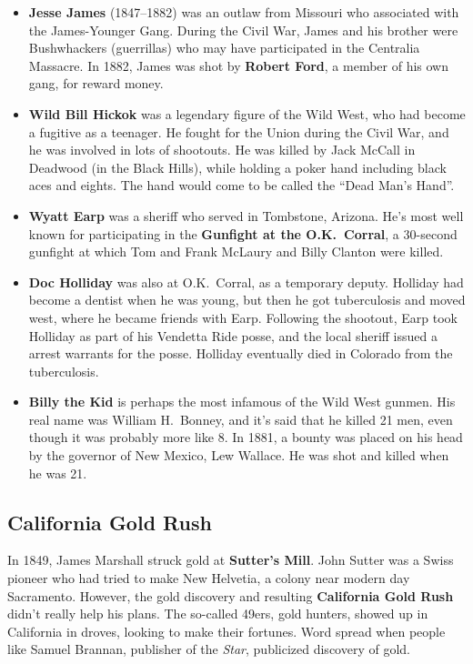 \begin{itemize}
  \item
    \textbf{Jesse James} (1847--1882) was an outlaw from Missouri who associated with the James-Younger Gang.
    During the Civil War,
    James and his brother were Bushwhackers (guerrillas) who may have participated in the Centralia Massacre.
    In 1882, James was shot by \textbf{Robert Ford}, a member of his own gang, for reward money.

  \item
    \textbf{Wild Bill Hickok} was a legendary figure of the Wild West, who had become a fugitive as a teenager.
    He fought for the Union during the Civil War, and he was involved in lots of shootouts.
    He was killed by Jack McCall in Deadwood (in the Black Hills),
    while holding a poker hand including black aces and eights.
    The hand would come to be called the ``Dead Man's Hand''.

  \item
    \textbf{Wyatt Earp} was a sheriff who served in Tombstone, Arizona.
    He's most well known for participating in the \textbf{Gunfight at the O.K.\ Corral},
    a 30-second gunfight at which Tom and Frank McLaury and Billy Clanton were killed.

  \item
    \textbf{Doc Holliday} was also at O.K.\ Corral, as a temporary deputy.
    Holliday had become a dentist when he was young, but then he got tuberculosis and moved west,
    where he became friends with Earp.
    Following the shootout, Earp took Holliday as part of his Vendetta Ride posse,
    and the local sheriff issued a arrest warrants for the posse.
    Holliday eventually died in Colorado from the tuberculosis.

  \item
    \textbf{Billy the Kid} is perhaps the most infamous of the Wild West gunmen.
    His real name was William H.\ Bonney, and it's said that he killed 21 men, even though it was probably more like 8.
    In 1881, a bounty was placed on his head by the governor of New Mexico, Lew Wallace.
    He was shot and killed when he was 21.

\end{itemize}

\subsection*{California Gold Rush}

In 1849, James Marshall struck gold at \textbf{Sutter's Mill}.
John Sutter was a Swiss pioneer who had tried to make New Helvetia, a colony near modern day Sacramento.
However, the gold discovery and resulting \textbf{California Gold Rush} didn't really help his plans.
The so-called 49ers, gold hunters, showed up in California in droves, looking to make their fortunes.
Word spread when people like Samuel Brannan, publisher of the \textit{Star}, publicized discovery of gold.

